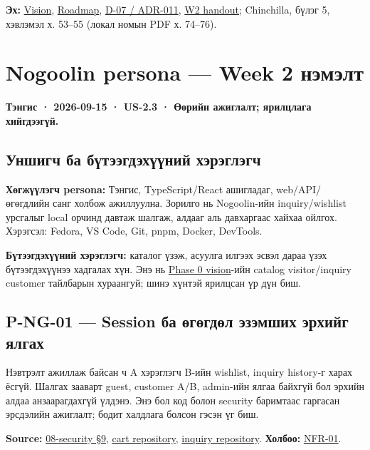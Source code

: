 \documentclass[
  11pt,
  a4paper,
]{article}
\begin{document}
\textbf{Эх:} \href{../../phase-0/01-vision.md}{Vision},
\href{../../phase-0/10-roadmap.md}{Roadmap},
\href{../../../agent-context/DECISIONS.md}{D-07 / ADR-011},
\href{Software_Project_Documentation_Week_02_Handout.pdf}{W2 handout};
Chinchilla, бүлэг 5, хэвлэмэл х. 53--55 (локал номын PDF х. 74--76).

\clearpage
\section{Nogoolin persona --- Week 2
нэмэлт}\label{doc2-nogoolin-persona-week-2-ux43dux44dux43cux44dux43bux442}

\textbf{Тэнгис · 2026-09-15 · US-2.3 · Өөрийн ажиглалт; ярилцлага
хийгдээгүй.}

\subsection{Уншигч ба бүтээгдэхүүний
хэрэглэгч}\label{doc2-ux443ux43dux448ux438ux433ux447-ux431ux430-ux431ux4afux442ux44dux44dux433ux434ux44dux445ux4afux4afux43dux438ux439-ux445ux44dux440ux44dux433ux43bux44dux433ux447}

\textbf{Хөгжүүлэгч persona:} Тэнгис, TypeScript/React ашигладаг,
web/API/өгөгдлийн санг холбож ажиллуулна. Зорилго нь Nogoolin-ийн
inquiry/wishlist урсгалыг local орчинд давтаж шалгаж, алдааг аль
давхаргаас хайхаа ойлгох. Хэрэгсэл: Fedora, VS Code, Git, pnpm, Docker,
DevTools.

\textbf{Бүтээгдэхүүний хэрэглэгч:} каталог үзэж, асуулга илгээх эсвэл
дараа үзэх бүтээгдэхүүнээ хадгалах хүн. Энэ нь
\href{../../phase-0/01-vision.md}{Phase 0 vision}-ийн catalog
visitor/inquiry customer тайлбарын хураангуй; шинэ хүнтэй ярилцсан үр
дүн биш.

\subsection{P-NG-01 --- Session ба өгөгдөл эзэмших эрхийг
ялгах}\label{doc2-p-ng-01-session-ux431ux430-ux4e9ux433ux4e9ux433ux434ux4e9ux43b-ux44dux437ux44dux43cux448ux438ux445-ux44dux440ux445ux438ux439ux433-ux44fux43bux433ux430ux445}

Нэвтрэлт ажиллаж байсан ч A хэрэглэгч B-ийн wishlist, inquiry history-г
харах ёсгүй. Шалгах зааварт guest, customer A/B, admin-ийн ялгаа байхгүй
бол эрхийн алдаа анзаарагдахгүй үлдэнэ. Энэ бол код болон security
баримтаас гаргасан эрсдэлийн ажиглалт; бодит халдлага болсон гэсэн үг
биш.

\textbf{Source:}
\href{../../phase-0/08-security.md\#9-idor-prevention}{08-security §9},
\href{../../../backend/api/src/repositories/supabase/cart.repository.ts}{cart
repository},
\href{../../../backend/api/src/repositories/supabase/inquiry.repository.ts}{inquiry
repository}. \textbf{Холбоо:}
\href{../../requirements/requirements.md\#nfr-01}{NFR-01}.
\end{document}
